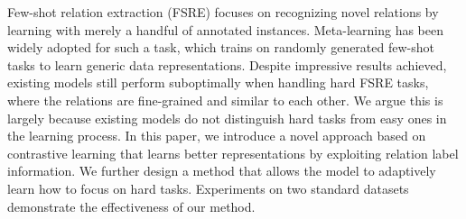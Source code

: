 Few-shot relation extraction (FSRE) focuses on recognizing novel relations by learning with merely a handful of annotated instances. Meta-learning has been widely adopted for such a task, which trains on randomly generated few-shot tasks to learn generic data representations. Despite impressive results achieved, existing models still perform suboptimally when handling hard FSRE tasks, where the relations are fine-grained and similar to each other. We argue this is largely because existing models do not distinguish hard tasks from easy ones in the learning process. In this paper, we introduce a novel approach based on contrastive learning that learns better representations by exploiting relation label information. We further design a method that allows the model to adaptively learn how to focus on hard tasks. Experiments on two standard datasets demonstrate the effectiveness of our method.

